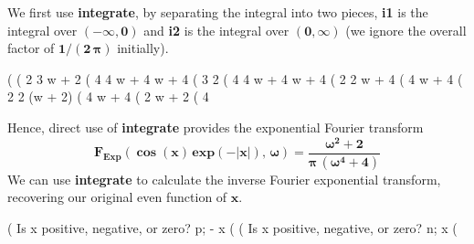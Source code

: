 \documentclass[12pt]{article}
\newcommand{\tcbr}{\textcolor{BrickRed}}
\begin{document}
\noindent We first use \textbf{integrate}, by separating the integral into two pieces,
  \textbf{i1} is the integral over $\mathbf{(-\infty,0)}$ and \textbf{i2} is the integral
  over $\mathbf{(0,\infty)}$ (we ignore the overall factor of $\mathbf{1/(2\,\boldsymbol{\pi}) }$
  initially).  
\begin{myVerbatim}
(%
(%
                                 2           3
                                w  + 2   %
(%
                                 4        4
                                w  + 4   w  + 4
(%
                                    3     2
(%
                                 4        4
                                w  + 4   w  + 4
(%
                                      2
                                   2 w  + 4
(%
                                     4
                                    w  + 4
(%
                                      2
                                  2 (w  + 2)
(%
                                     4
                                    w  + 4
(%
                                     2
                                    w  + 2
(%
                                       4
\end{myVerbatim}
Hence, direct use of \textbf{integrate} provides the exponential Fourier transform
\begin{equation}
\mathbf{F_{Exp}(\cos(x)\,exp(-\vert x \vert),\, \boldsymbol{\omega}) = 
 \frac{\boldsymbol{\omega}^{2} + 2}{\boldsymbol{\pi}\,( \boldsymbol{\omega}^{4} + 4) } }
\end{equation}
We can use \textbf{integrate} to calculate the \tcbr{inverse} Fourier exponential transform,
  recovering our original even function of $\mathbf{x}$.
\begin{myVerbatim}
(%
Is  x  positive, negative, or zero?
p;
                                   - x
(%
(%
Is  x  positive, negative, or zero?
n;
                                    x
(%
\end{myVerbatim}
\end{document}
